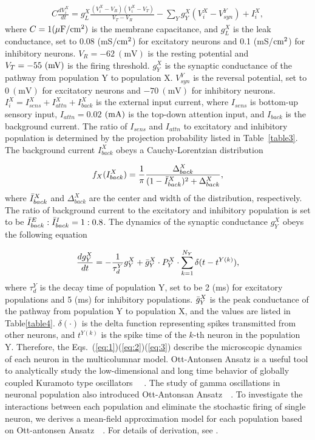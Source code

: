\documentclass[10pt,letterpaper]{article}
\begin{document}
\begin{eqnarray}
\label{eq:1}
    C\frac{dV_{i}^{X}}{dt} = g_{L}^{X}\frac{(V_{i}^{X}-V_{R})(V_{i}^{X}-V_{T})}{V_{T}-V_{R}}-\sum_{Y}g_{Y}^{X}(V_{i}^{X}-V_{syn}^{Y}) + I_{i}^{X},
\end{eqnarray}
where $C=1(\rm \mu F/cm^2)$ is the membrane capacitance, and $g_{L}^{X}$ is the leak conductance, set to 0.08 (mS/$\rm cm^{2}$) for excitatory neurons and 0.1 (mS/$\rm cm^{2}$) for inhibitory neurons. $V_{R}=-62\ \mathrm{(mV)}$ is the resting potential and $V_{T}=-55\ (\rm mV)$ is the firing threshold. $g_{Y}^{X}$ is the synaptic conductance of the pathway from population Y to population X. $V_{syn}^{Y}$ is the reversal potential, set to  $0\ \mathrm{(mV)}$ for excitatory neurons and $-70\ \mathrm{(mV)}$ for inhibitory neurons. $I_{i}^{X}=I_{sens}^{X} + I_{attn}^{X} + I_{back}^{X}$ is the external input current, where $I_{sens}$ is bottom-up sensory input, $I_{attn}=0.02$ $(\rm mA)$ is the top-down attention input, and $I_{back}$ is the background current. The ratio of $I_{sens}$ and $I_{attn}$ to excitatory and inhibitory population is determined by the projection probability listed in Table~\ref{table3}. The background current $I_{back}^{X}$ obeys a Cauchy-Lorentzian distribution

\begin{eqnarray}
\label{eq:2}
        f_{X}(I_{back}^{X}) = \frac{1}{\pi}\frac{\Delta_{back}^{X}}{(1-\Bar{I}_{back}^{X})^{2}+\Delta_{back}^{X}},
\end{eqnarray}
where $\Bar{I}_{back}^{X}$ and $\Delta_{back}^{X}$ are the center and width of the distribution, respectively. The ratio of background current to the excitatory and inhibitory population is set to be $\Bar{I}_{back}^{E} : \Bar{I}_{back}^{I} = 1:0.8$. The dynamics of the synaptic conductance $g_{Y}^{X}$ obeys the following equation

\begin{eqnarray}
\label{eq:3}
    \frac{dg_{Y}^{X}}{dt} = -\frac{1}{\tau_{d}^{Y}}g_{Y}^{X}+\Bar{g}_{Y}^{X}\cdot P_{Y}^{X}\cdot\sum_{k=1}^{N_{Y}}\delta(t-t^{Y(k)}),
\end{eqnarray}
where $\tau_{d}^{Y}$ is the decay time of population Y, set to be 2 (ms) for excitatory populations and 5 (ms) for inhibitory populations. $\Bar{g}_{Y}^{X}$ is the peak conductance of the pathway from population Y to population X, and the values are listed in Table\ref{table4}. $\delta(\cdot)$ is the delta function representing spikes transmitted from other neurons, and $t^{Y(k)}$ is the spike time of the $k$-th neuron in the population Y. Therefore, the Eqs.~(\ref{eq:1})(\ref{eq:2})(\ref{eq:3}) describe the microscopic dynamics of each neuron in the multicolumnar model. Ott-Antonsen Ansatz is a useful tool to analytically study the low-dimensional and long time behavior of globally coupled Kuramoto type oscillators ~\cite{ott2008}~\cite{ott2009}. The study of gamma oscillations in neuronal population also introduced Ott-Antonsan Ansatz~\cite{akao2019}~\cite{zheng2021}. To investigate the interactions between each population and eliminate the stochastic firing of single neuron, we derives a mean-field approximation model for each population based on Ott-antonsen Ansatz~\cite{ott2008}~\cite{montbrio2015}. For details of derivation, see .
\end{document}
